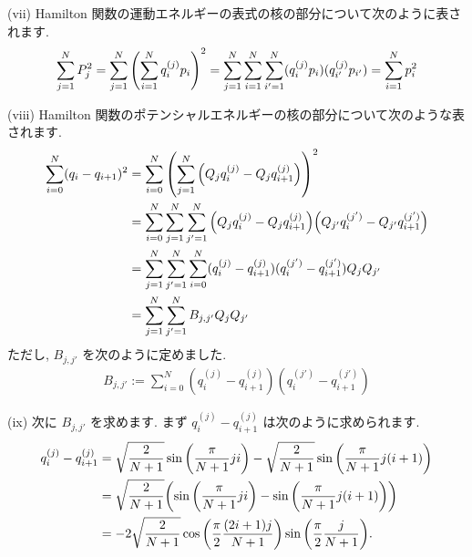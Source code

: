 \documentclass[a4paper,dvipdfmx]{jsarticle}
\theoremstyle{definition}
\begin{document}
(vii) Hamilton 関数の運動エネルギーの表式の核の部分について次のように表されます.
\begin{align}
  \sum_{j=1}^{N}P_j^2 = \sum_{j=1}^{N}\qty(\sum_{i=1}^{N}q_i^{(j)}p_i)^2 = \sum_{j=1}^{N}\sum_{i=1}^{N}\sum_{i'=1}^{N}(q_i^{(j)}p_i)(q_{i'}^{(j)}p_{i'}) = \sum_{i=1}^{N}p_i^2
\end{align}

(viii) Hamilton 関数のポテンシャルエネルギーの核の部分について次のような表されます.
\begin{align}
  \sum_{i=0}^{N}(q_i - q_{i+1})^2 & = \sum_{i=0}^{N}\qty(\sum_{j=1}^{N}\qty(Q_jq_i^{(j)} - Q_jq_{i+1}^{(j)}))^2                                                     \\
                                  & = \sum_{i=0}^{N}\sum_{j=1}^{N}\sum_{j'=1}^{N}\qty(Q_jq_i^{(j)} - Q_jq_{i+1}^{(j)})\qty(Q_{j'}q_i^{(j')} - Q_{j'}q_{i+1}^{(j')}) \\
                                  & = \sum_{j=1}^{N}\sum_{j'=1}^{N}\sum_{i=0}^{N}(q_i^{(j)} - q_{i+1}^{(j)})(q_i^{(j')} - q_{i+1}^{(j')})Q_jQ_{j'}                  \\
                                  & = \sum_{j=1}^{N}\sum_{j'=1}^{N}B_{j,j'}Q_jQ_{j'}
\end{align}
ただし, $B_{j,j'}$ を次のように定めました.
\begin{align}
  B_{j,j'} := \sum_{i=0}^{N}(q_i^{(j)} - q_{i+1}^{(j)})(q_i^{(j')} - q_{i+1}^{(j')})
\end{align}

(ix) 次に $B_{j,j'}$ を求めます. まず $q_i^{(j)} - q_{i+1}^{(j)}$ は次のように求められます.
\begin{align}
  q_i^{(j)} - q_{i+1}^{(j)} & = \sqrt{\frac{2}{N+1}}\sin\qty(\frac{\pi}{N+1}ji) - \sqrt{\frac{2}{N+1}}\sin\qty(\frac{\pi}{N+1}j(i+1)) \\
                            & = \sqrt{\frac{2}{N+1}}\qty(\sin\qty(\frac{\pi}{N+1}ji) - \sin\qty(\frac{\pi}{N+1}j(i+1)))               \\
                            & = -2\sqrt{\frac{2}{N+1}}\cos\qty(\frac{\pi}{2}\frac{(2i+1)j}{N+1})\sin\qty(\frac{\pi}{2}\frac{j}{N+1}).
\end{align}
\end{document}
